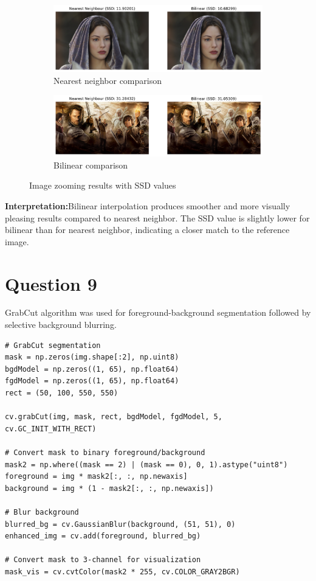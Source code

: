 \documentclass[10pt,a4paper]{article}
\begin{document}
\begin{figure}[H]
    \centering
    \begin{subfigure}{0.48\textwidth}
        \includegraphics[width=\textwidth]{task8/comparison_nearest_ssd_11_90201.png}
        \caption{Nearest neighbor comparison}
    \end{subfigure}
    \hfill
    \begin{subfigure}{0.48\textwidth}
        \includegraphics[width=\textwidth]{task8/comparison_nearest_ssd_31_28432.png}
        \caption{Bilinear comparison}
    \end{subfigure}
    \caption{Image zooming results with SSD values}
\end{figure}

\textbf{Interpretation:}Bilinear interpolation produces smoother and more visually pleasing results compared to nearest neighbor. The SSD value is slightly lower for bilinear than for nearest neighbor, indicating a closer match to the reference image.

\newpage

\section{Question 9}
GrabCut algorithm was used for foreground-background segmentation followed by selective background blurring.

\begin{lstlisting}[caption=GrabCut segmentation and background blur]
# GrabCut segmentation
mask = np.zeros(img.shape[:2], np.uint8)
bgdModel = np.zeros((1, 65), np.float64)
fgdModel = np.zeros((1, 65), np.float64)
rect = (50, 100, 550, 550)

cv.grabCut(img, mask, rect, bgdModel, fgdModel, 5, cv.GC_INIT_WITH_RECT)

# Convert mask to binary foreground/background
mask2 = np.where((mask == 2) | (mask == 0), 0, 1).astype("uint8")
foreground = img * mask2[:, :, np.newaxis]
background = img * (1 - mask2[:, :, np.newaxis])

# Blur background
blurred_bg = cv.GaussianBlur(background, (51, 51), 0)
enhanced_img = cv.add(foreground, blurred_bg)

# Convert mask to 3-channel for visualization
mask_vis = cv.cvtColor(mask2 * 255, cv.COLOR_GRAY2BGR)
\end{lstlisting}
\end{document}
